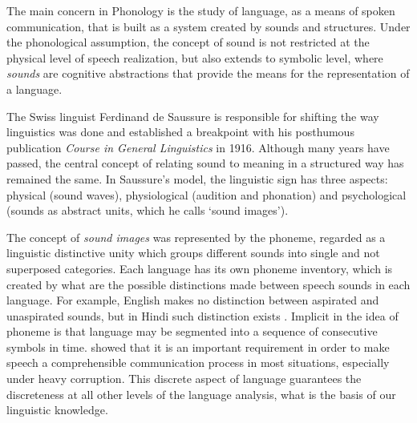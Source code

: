 The main concern in Phonology is the study of language, as a means of spoken communication, that is built as a system
created by sounds and structures. Under the phonological assumption, 
the concept of sound is not restricted at the physical level of speech
realization, but also extends to symbolic level, where \textit{sounds} are cognitive abstractions
that provide the means for the representation of a language.

The Swiss linguist Ferdinand de Saussure is responsible for
shifting the way linguistics was done and established a breakpoint with his posthumous
publication \textit{Course in General Linguistics} in 1916.
Although many years have passed, the central concept of relating sound to meaning in a structured way 
has remained the same. In Saussure's model, the linguistic sign has three aspects: 
physical (sound waves), physiological (audition and phonation) and psychological (sounds as abstract units,
which he calls `sound images').

The concept of \textit{sound images} was represented by the phoneme, regarded as a linguistic distinctive unity
which groups different sounds into single and not superposed categories.
Each language has its own phoneme inventory, which is created by what are the possible distinctions made between 
speech sounds in each language. For example, English makes no distinction between aspirated and unaspirated sounds,
but in Hindi such distinction exists \citep{ladefoged1996}.
Implicit in the idea of phoneme is that language may be segmented into a sequence of
consecutive symbols in time. %
\citet{mandelbrot} showed that it is an important requirement
in order to make speech a comprehensible communication process in most situations,
especially under heavy corruption. This discrete aspect of language guarantees the discreteness at all other levels
of the language analysis, what is the basis of our linguistic knowledge.




